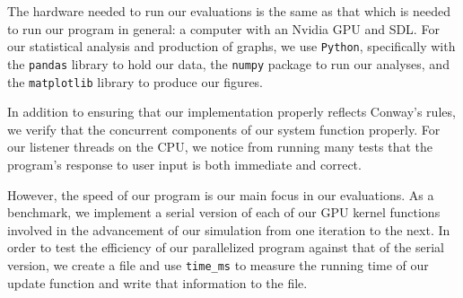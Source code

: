 \documentclass[onecolumn,12pt]{IEEEtran}
\begin{document}

  The hardware needed to run our evaluations is the same as that which is needed
  to run our program in general: a computer with an Nvidia GPU and SDL. For our
  statistical analysis and production of graphs, we use \texttt{Python},
  specifically with the \texttt{pandas} library to hold our data, the
  \texttt{numpy} package to run our analyses, and the \texttt{matplotlib} library
  to produce our figures.  

  In addition to ensuring that our implementation properly reflects Conway's
  rules, we verify that the concurrent components of our system function
  properly. For our listener threads on the CPU, we notice from running many
  tests that the program's response to user input is both immediate and correct. 

  However, the speed of our program is our main focus in our evaluations. As a
  benchmark, we implement a serial version of each of our GPU kernel functions
  involved in the advancement of our simulation from one iteration to the next.
  In order to test the efficiency of our parallelized program against that of the
  serial version, we create a file and use \texttt{time\_ms} to measure the
  running time of our update function and write that information to the file. 
\end{document}
